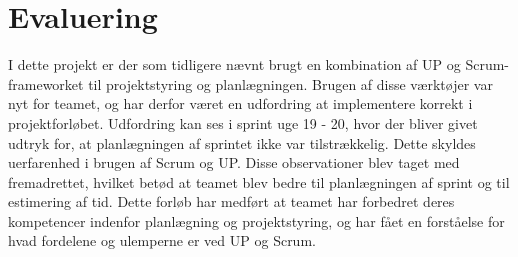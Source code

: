 \documentclass[../main.tex]{subfiles}
\begin{document}
\section{Evaluering}

I dette projekt er der som tidligere nævnt brugt en kombination af UP og Scrum-frameworket til projektstyring og planlægningen. Brugen af disse værktøjer var nyt for teamet, og har derfor været en udfordring at implementere korrekt i projektforløbet. Udfordring kan ses i sprint uge 19 - 20, hvor der bliver givet udtryk for, at planlægningen af sprintet ikke var tilstrækkelig. Dette skyldes uerfarenhed i brugen af Scrum og UP. Disse observationer blev taget med fremadrettet, hvilket betød at teamet blev bedre til planlægningen af sprint og til estimering af tid. Dette forløb har medført at teamet har forbedret deres kompetencer indenfor planlægning og projektstyring, og har fået en forståelse for hvad fordelene og ulemperne er ved UP og Scrum.   
\end{document}
